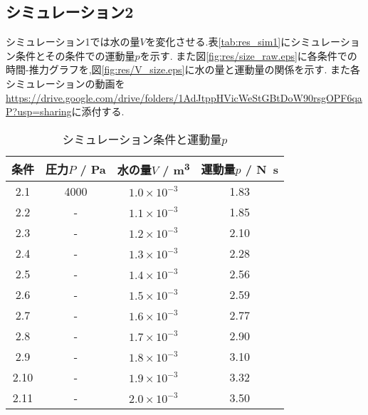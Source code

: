 \subsection{シミュレーション2}
シミュレーション1では水の量$V$を変化させる.表\ref{tab:res_sim1}にシミュレーション条件とその条件での運動量$p$を示す.
また図\ref{fig:res/size_raw.eps}に各条件での時間-推力グラフを,図\ref{fig:res/V_size.eps}に水の量と運動量の関係を示す.
また各シミュレーションの動画を\url{https://drive.google.com/drive/folders/1AdJtppHVicWeStGBtDoW90rsgOPF6qaP?usp=sharing}に添付する.
\begin{table}[h]
\caption{シミュレーション条件と運動量$p$}
\label{tab:res_sim2}
\centering
\begin{tabular}{cccc}
\hline
条件&圧力$P$ / \si{\pascal}&水の量$V$ / \si{\metre^3}&運動量$p$ / \si{\newton.\second}\\
\hline \hline
2.1&4000&$1.0\times10^{-3}$&1.83\\
2.2&-&$1.1\times10^{-3}$&1.85\\
2.3&-&$1.2\times10^{-3}$&2.10\\
2.4&-&$1.3\times10^{-3}$&2.28\\
2.5&-&$1.4\times10^{-3}$&2.56\\
2.6&-&$1.5\times10^{-3}$&2.59\\
2.7&-&$1.6\times10^{-3}$&2.77\\
2.8&-&$1.7\times10^{-3}$&2.90\\
2.9&-&$1.8\times10^{-3}$&3.10\\
2.10&-&$1.9\times10^{-3}$&3.32\\
2.11&-&$2.0\times10^{-3}$&3.50\\
\hline
\end{tabular}
\end{table}
